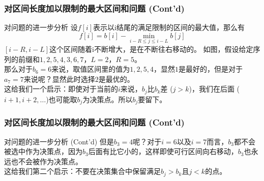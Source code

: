 \documentclass[hyperref={unicode=true}]{beamer}
\theoremstyle{definition}
\theoremstyle{proof}
\begin{document}
\begin{frame}\frametitle{对区间长度加以限制的最大区间和问题 (Cont'd)}
  \begin{alertblock}{对问题的进一步分析}
    设$f[i]$表示以i结尾的满足限制的区间的最大值，那么有
    \[f[i] = b[i] - \min_{i-R\leq j\leq i-L}b[j]\]
    $[i-R,i-L]$这个区间随着i不断增大，是在不断往右移动的。
    如图，假设给定序列的前缀和${1,2,5,4,3, 6, 7}$，$L=2$，$R=5$。\\
    那么对于$b_6=6$来说，取值区间里的值为${1,2,5,4}$，显然$1$是最好的，但是对于$a_{7}=7$来说呢？显然此时选择$2$是最优的。\\
    这给我们一个启示：即使对于当前的$i$来说，$b_j$比$b_k$差 ($j>k$)，我们在后面 ($i+1,i+2,\ldots$)也可能取$b_j$为决策点。所以$b_j$要留下。\\
  \end{alertblock}
\end{frame}
\begin{frame}\frametitle{对区间长度加以限制的最大区间和问题 (Cont'd)}
  \begin{alertblock}{对问题的进一步分析 (Cont'd)}
    但是$b_3=4$呢？对于$i=6$以及$i=7$而言，$b_3$都不会被选中作为决策点，因为$b_3$后面有比它小的，这样即使可行区间向右移动，$b_3$也永远也不会被作为决策点。\\
    这给我们第二个启示：不要在决策集合中保留满足$b_j>b_k$且$j<k$的点。
  \end{alertblock}
\end{frame}
\end{document}
